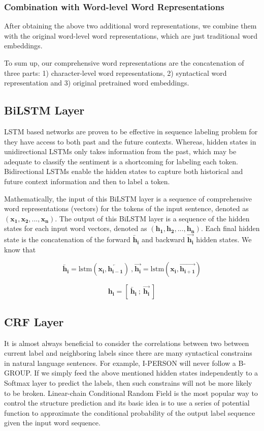 \subsubsection{Combination with Word-level Word Representations}
After obtaining the above two additional word representations, we combine them with the original word-level word representations, which are just traditional word embeddings. 

To sum up, our comprehensive word representations are the concatenation of three parts: 1) character-level word representations, 2) syntactical word representation and 3)  original pretrained word embeddings.

\subsection{BiLSTM Layer}
LSTM based networks are proven to be effective in sequence labeling problem for they have access to both past and the future contexts. 
Whereas, hidden states in unidirectional LSTMs only takes information from the past, which may be adequate to classify the sentiment  is a shortcoming for labeling each token.
Bidirectional LSTMs enable the hidden states to capture both historical and future context information and then to label a token.

Mathematically, the input of this BiLSTM layer is a sequence of comprehensive word representations (vectors) for the tokens of the input sentence,  denoted as 
$( \mathbf{x_1}, \mathbf{x_2},...,\mathbf{x_n})$. 
The output of this BiLSTM layer is a sequence of the hidden states for each input word vectors, denoted as 
$( \mathbf{h_1}, \mathbf{h_2},...,\mathbf{h_n})$. 
Each final hidden state is the concatenation of the forward $\overleftarrow{\mathbf{h_i}}$ and backward $\overrightarrow{\mathbf{h_i}}$ hidden states.
We know that 

$$\overleftarrow{\mathbf{h_i}}= \text{lstm}(\mathbf{x_i}, \overleftarrow{\mathbf{h_{i-1}}})~\text{,}~\overrightarrow{\mathbf{h_i}}= \text{lstm}(\mathbf{x_i}, \overrightarrow{\mathbf{h_{i+1}}})$$ 

$$\mathbf{h_i} = \left[~\overleftarrow{\mathbf{h_i}}~;~\overrightarrow{\mathbf{h_i}}~\right]$$


\subsection{CRF Layer}
It is almost always beneficial to consider the correlations between two between current label and neighboring labels since there are many syntactical constrains in natural language sentences. 
For example, I-PERSON will never follow a B-GROUP. 
If we simply feed the above mentioned hidden states independently to a Softmax layer to predict the labels, then such constrains will not be more likely to be broken. 
Linear-chain Conditional Random Field is the most popular way to control the structure prediction and its basic idea is to use a series of potential function to approximate the conditional probability of the output label sequence given the input word sequence. 

